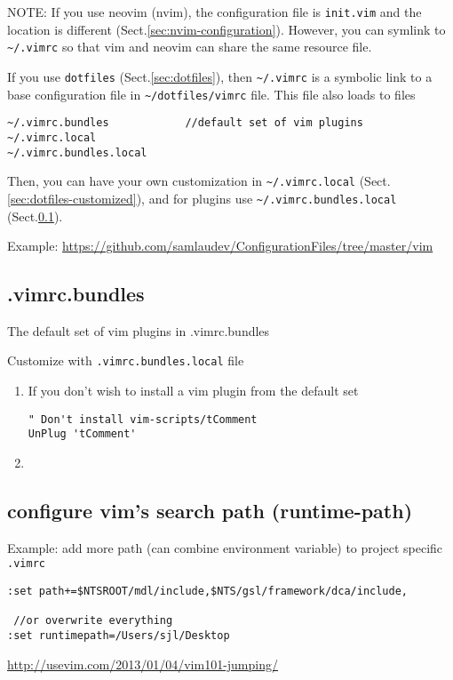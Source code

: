 NOTE: If you use neovim (nvim), the configuration file is
\verb!init.vim! and the location is different
(Sect.\ref{sec:nvim-configuration}). However, you can symlink to 
\verb!~/.vimrc! so that vim and neovim can share the same resource file. 

If you use \verb!dotfiles! (Sect.\ref{sec:dotfiles}), then \verb!~/.vimrc! is a
symbolic link to a base configuration file in \verb!~/dotfiles/vimrc! file. This
file also loads to files
\begin{verbatim}
~/.vimrc.bundles            //default set of vim plugins
~/.vimrc.local
~/.vimrc.bundles.local
\end{verbatim}
Then, you can have your own customization in \verb!~/.vimrc.local!
(Sect.\ref{sec:dotfiles-customized}), and for plugins use
\verb!~/.vimrc.bundles.local! (Sect.\ref{sec:dotvimrc.bundles}).

Example: \url{https://github.com/samlaudev/ConfigurationFiles/tree/master/vim}

\subsection{.vimrc.bundles}
\label{sec:dotvimrc.bundles}

The  default set of vim plugins in .vimrc.bundles


Customize with \verb!.vimrc.bundles.local! file

\begin{enumerate}
  \item If you don't wish to install a vim plugin from the default set 
  
\begin{verbatim}
" Don't install vim-scripts/tComment
UnPlug 'tComment'
\end{verbatim}

  \item 
\end{enumerate}


\subsection{configure vim's search path (runtime-path)}
\label{sec:vim-search-path}
\label{sec:vim-rtp}
\label{sec:vim-runtimepath}

Example: add more path (can combine environment variable) to project specific
\verb!.vimrc!
\begin{verbatim}
:set path+=$NTSROOT/mdl/include,$NTS/gsl/framework/dca/include,

 //or overwrite everything
:set runtimepath=/Users/sjl/Desktop
\end{verbatim}
\url{http://usevim.com/2013/01/04/vim101-jumping/}

